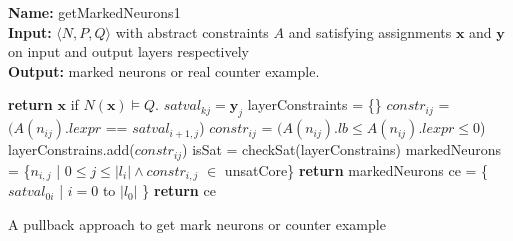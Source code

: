 \begin{algorithm}[t]
  \textbf{Name: } getMarkedNeurons1 \\
  \textbf{Input: } $\langle N,P,Q \rangle$ with abstract constraints $A$ and satisfying assignments $\boldsymbol{x}$ and $\boldsymbol{y}$ on input and output layers respectively\\
  \textbf{Output: } marked neurons or real counter example. 
  \begin{algorithmic}[1]
    \State \textbf{return} $\boldsymbol{x}$ if $N(\boldsymbol{x}) \models Q$. 
    \State $satval_{kj} = \boldsymbol{y}_j$
   \EndFor
        \State layerConstraints = \{\}
            \State $constr_{ij}$ = $(A(n_{ij}).lexpr$ == $satval_{i+1,j}$) 
          \Else
            \State $constr_{ij}$ = $(A(n_{ij}).lb \leq A(n_{ij}).lexpr \leq 0$)
          \EndIf
          \State layerConstrains.add($constr_{ij}$)
        \EndFor
        \State isSat = checkSat(layerConstrains) 
          \State markedNeurons = \{$n_{i,j}$ | $0 \leq j\leq |l_i| \land constr_{i,j}$ $\in$ unsatCore\}
          \State \textbf{return } markedNeurons
        \EndIf
      \EndIf
   \EndFor
    \State ce = \{$satval_{0i}$ | $i=0$ to $|l_0|$ \} 
    \State \textbf{return} ce
  \end{algorithmic}
  \caption{A pullback approach to get mark neurons or counter example}
  \label{algo:refine1}
\end{algorithm}


